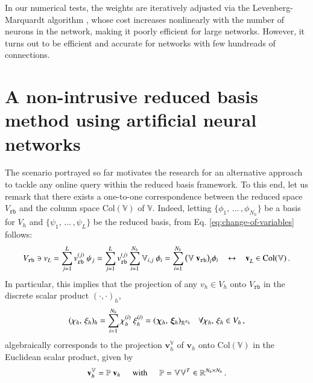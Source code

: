 \documentclass[longtitle]{elsarticle}
\numberwithin{equation}{section}
\theoremstyle{theorem}
\theoremstyle{definition}
\theoremstyle{remark}
\theoremstyle{proposition}
\numberwithin{figure}{section}
\newcommand{\bg}[1]{\boldsymbol{#1}}
\begin{document}
		In our numerical tests, the weights are iteratively adjusted via the Levenberg-Marquardt algorithm \cite{Hag94, Mar63}, whose cost increases nonlinearly with the number of neurons in the network, making it poorly efficient for large networks. However, it turns out to be efficient and accurate for networks with few hundreads of connections.

		
	
	\section{A non-intrusive reduced basis method using artificial neural networks}
	\label{section:A non-intrusive RB method using neural networks}
							
		The scenario portrayed so far motivates the research for an alternative approach to tackle any online query within the reduced basis framework. To this end, let us remark that there exists a one-to-one correspondence between the reduced space $V_{\texttt{rb}}$ and the column space $\text{Col}(\mathbb{V})$ of $\mathbb{V}$. Indeed, letting $\big\lbrace \phi_1, \, \ldots \, , \phi_{N_h} \big\rbrace$ be a basis for $V_h$ and $\big\lbrace \psi_1, \, \ldots \, , \psi_L \big\rbrace$ be the reduced basis, from Eq. \eqref{eq:change-of-variables} follows:
		\begin{equation*}
			V_{\texttt{rb}} \ni v_{L} = \sum_{j = 1}^L v_{\texttt{rb}}^{(j)} ~ \psi_j = \sum_{j = 1}^L v_{\texttt{rb}}^{(j)} \sum_{i = 1}^{N_h} \mathbb{V}_{i,j} ~ \phi_i = \sum_{i = 1}^{N_h} \big( \mathbb{V} ~ \mathbf{v}_{\texttt{rb}} \big)_i \phi_i \hspace*{0.3cm} \leftrightarrow \hspace*{0.3cm} \mathbf{v}_L^{} \in \text{Col}(\mathbb{V}) \, .
		\end{equation*} 
		In particular, this implies that the projection of any $v_h \in V_h$ onto $V_{\texttt{rb}}$ in the discrete scalar product $(\cdot,\cdot)_h$, 
		\begin{equation}
			\label{eq:discrete-scalar-product}
			(\chi_h, \, \xi_h)_h = \sum_{i = 1}^{N_h} \chi_h^{(i)} ~ \xi_h^{(i)} = (\bg{\chi}_h, \, \bg{\xi}_h)_{\mathbb{R}^{N_h}} \hspace*{0.3cm} \text{$\forall \chi_h, \, \xi_h \in V_h$} \, , 
		\end{equation}
		algebraically corresponds to the projection $\mathbf{v}_h^{\mathbb{V}}$ of $\mathbf{v}_h$ onto $\text{Col}(\mathbb{V})$ in the Euclidean scalar product, given by
		\begin{equation*}
			\mathbf{v}_h^{\mathbb{V}} = \mathbb{P} ~ \mathbf{v}_h \hspace*{0.5cm} \text{with} \hspace*{0.5cm} \mathbb{P} = \mathbb{V} \mathbb{V}^T \in \mathbb{R}^{{N_h} \times {N_h}} \, .
		\end{equation*}
\end{document}
